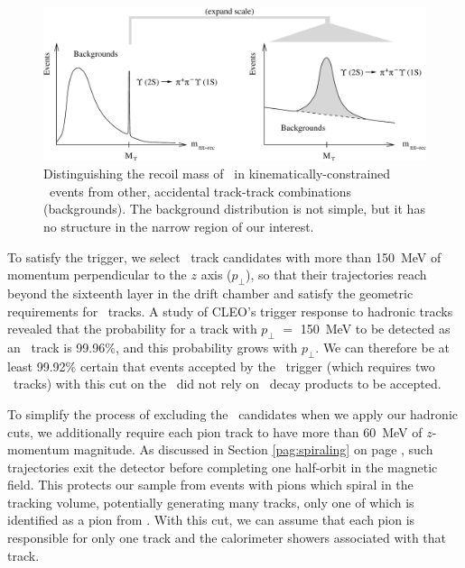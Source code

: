 \documentclass{cornell}
\begin{document}
\begin{figure}[t]
  \begin{center}
    \includegraphics[width=\linewidth]{plots/cascadescartoon}
  \end{center}
  \caption{\label{cascadescartoon} Distinguishing the recoil mass of
  \pipi\ in kinematically-constrained \twotoone\ events from other,
  accidental track-track combinations (backgrounds).  The background
  distribution is not simple, but it has no structure in the narrow
  region of our interest.}
\end{figure}

To satisfy the trigger, we select \pipi\ track candidates with more
than 150~MeV of momentum perpendicular to the $z$ axis ($p_\perp$), so
that their trajectories reach beyond the sixteenth layer in the drift
chamber and satisfy the geometric requirements for \axial\ tracks.  A
study of CLEO's trigger response to hadronic tracks revealed that the
probability for a track with $p_\perp$ $=$ 150~MeV to be detected as an
\axial\ track is 99.96\%, and this probability grows with $p_\perp$.
We can therefore be at least 99.92\% certain that events accepted by
the \twotrack\ trigger (which requires two \axial\ tracks) with this
cut on the \pipi\ did not rely on \us\ decay products to be accepted.

To simplify the process of excluding the \pipi\ candidates when we
apply our hadronic cuts, we additionally require each pion track to
have more than 60~MeV of $z$-momentum magnitude.  As discussed in
Section \ref{pag:spiraling} on page \pageref{pag:spiraling}, such
trajectories exit the detector before completing one half-orbit in the
magnetic field.  This protects our sample from events with pions which
spiral in the tracking volume, potentially generating many tracks,
only one of which is identified as a pion from \twotoone.  With this
cut, we can assume that each pion is responsible for only one track
and the calorimeter showers associated with that track.
\end{document}
